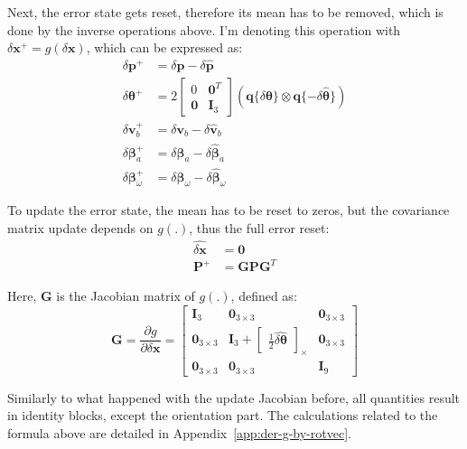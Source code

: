 Next, the error state gets reset, therefore its mean has to be removed, which is done by the inverse operations above. I'm denoting this operation with $\delta\mathbf{x}^+=g(\delta\mathbf{x})$, which can be expressed as:
\begin{subequations}
\begin{align}
    \delta\mathbf{p}^+ &= \delta\mathbf{p} - \delta\hat{\mathbf{p}}\\
    \delta\boldsymbol{\theta}^+ &= 2\begin{bmatrix}
        0 & \mathbf{0}^T \\
        \mathbf{0} & \mathbf{I}_3
    \end{bmatrix}\left(\mathbf{q}\{\delta\boldsymbol{\theta}\}\otimes\mathbf{q}\{-\delta\hat{\boldsymbol{\theta}}\}\right) 
    \label{subeq:g-rotvec}\\
    \delta\mathbf{v}_b^+ &= \delta\mathbf{v}_{b} - \delta\hat{\mathbf{v}}_{b} \\
    \delta\boldsymbol{\beta}_{a}^+ &= \delta\boldsymbol{\beta}_{a} - \delta\hat{\boldsymbol{\beta}}_{a} \\
    \delta\boldsymbol{\beta}_{\omega}^+ &= \delta\boldsymbol{\beta}_{\omega} - \delta\hat{\boldsymbol{\beta}}_{\omega}
\end{align}
\end{subequations}

To update the error state, the mean has to be reset to zeros, but the covariance matrix update depends on $g(.)$, thus the full error reset:
\begin{subequations}
\begin{align}
    \hat{\delta\mathbf{x}} &=\mathbf{0} \\
    \mathbf{P}^+ &= \mathbf{G}\mathbf{P}\mathbf{G}^T
\end{align}    
\end{subequations}

Here, $\mathbf{G}$ is the Jacobian matrix of $g(.)$, defined as:
\begin{equation}
    \mathbf{G}=\frac{\partial g}{\partial\delta\mathbf{x}}=\begin{bmatrix}
        \mathbf{I}_3 & \mathbf{0}_{3\times 3} & \mathbf{0}_{3\times 3} \\
        \mathbf{0}_{3\times 3} & \mathbf{I}_3+\begin{bmatrix}
            \frac{1}{2}\hat{\delta\boldsymbol{\theta}}
        \end{bmatrix}_\times & \mathbf{0}_{3\times 3} \\
        \mathbf{0}_{3\times 3} & \mathbf{0}_{3\times 3} & \mathbf{I}_9
    \end{bmatrix}
\end{equation}

Similarly to what happened with the update Jacobian before, all quantities result in identity blocks, except the orientation part. The calculations related to the formula above are detailed in Appendix~\ref{app:der-g-by-rotvec}.